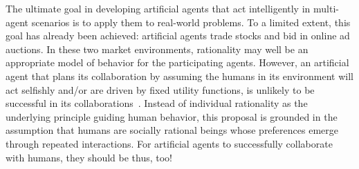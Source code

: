 The ultimate goal in developing artificial agents that act
intelligently in multi-agent scenarios is to apply them to real-world
problems.  To a limited extent, this goal has already been achieved:
artificial agents trade stocks and bid in online ad auctions.  In
these two market environments, rationality may well be an appropriate
model of behavior for the participating agents.  However,
an artificial agent that plans its collaboration by assuming the
humans in its environment will act selfishly and/or are driven by
fixed utility functions, is unlikely to be successful in its
collaborations~\cite{Camerer:2003,kahnemanst82}.  Instead of
individual rationality as the underlying principle guiding human
behavior, this proposal is grounded in the assumption that humans are
socially rational beings whose preferences emerge through repeated
interactions.  For artificial agents to successfully collaborate with
humans, they should be thus, too!

